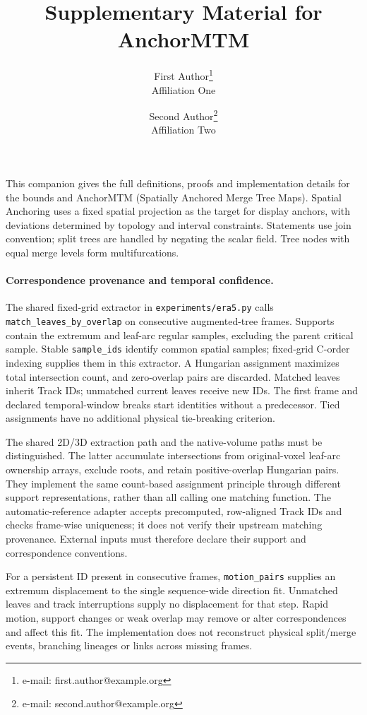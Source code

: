 \documentclass{vgtc}                %
\title{Supplementary Material for AnchorMTM}
\author{First Author\thanks{e-mail: first.author@example.org}\\ %
        \scriptsize Affiliation One %
\and Second Author\thanks{e-mail: second.author@example.org}\\ %
     \scriptsize Affiliation Two}
\begin{document}
\maketitle
This companion gives the full definitions, proofs and implementation details for the bounds and AnchorMTM (Spatially Anchored Merge Tree Maps). Spatial Anchoring uses a fixed spatial projection as the target for display anchors, with deviations determined by topology and interval constraints. Statements use join convention; split trees are handled by negating the scalar field. Tree nodes with equal merge levels form multifurcations.
\paragraph{Correspondence provenance and temporal confidence.}
The shared fixed-grid extractor in \texttt{experiments/era5.py} calls \texttt{match\_leaves\_by\_overlap} on consecutive augmented-tree frames. Supports contain the extremum and leaf-arc regular samples, excluding the parent critical sample. Stable \texttt{sample\_ids} identify common spatial samples; fixed-grid C-order indexing supplies them in this extractor. A Hungarian assignment maximizes total intersection count, and zero-overlap pairs are discarded. Matched leaves inherit Track IDs; unmatched current leaves receive new IDs. The first frame and declared temporal-window breaks start identities without a predecessor. Tied assignments have no additional physical tie-breaking criterion.

The shared 2D/3D extraction path and the native-volume paths must be distinguished. The latter accumulate intersections from original-voxel leaf-arc ownership arrays, exclude roots, and retain positive-overlap Hungarian pairs. They implement the same count-based assignment principle through different support representations, rather than all calling one matching function. The automatic-reference adapter accepts precomputed, row-aligned Track IDs and checks frame-wise uniqueness; it does not verify their upstream matching provenance. External inputs must therefore declare their support and correspondence conventions.

For a persistent ID present in consecutive frames, \texttt{motion\_pairs} supplies an extremum displacement to the single sequence-wide direction fit. Unmatched leaves and track interruptions supply no displacement for that step. Rapid motion, support changes or weak overlap may remove or alter correspondences and affect this fit. The implementation does not reconstruct physical split/merge events, branching lineages or links across missing frames.
\end{document}
